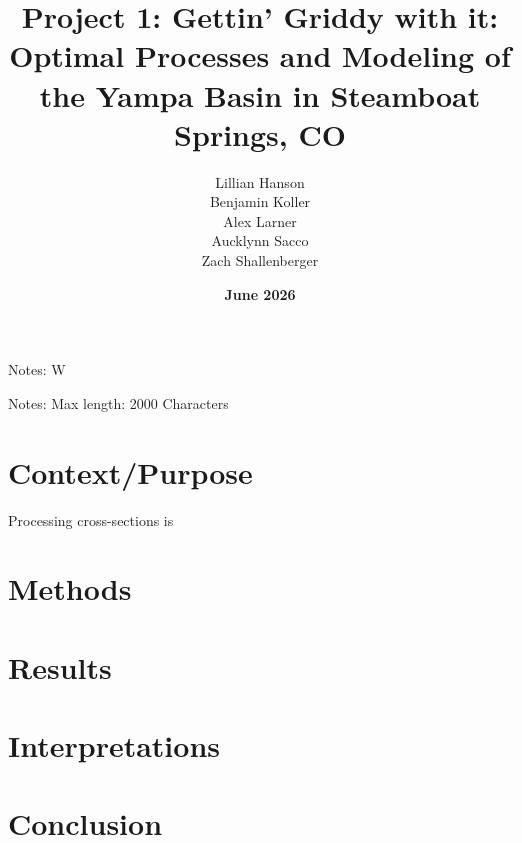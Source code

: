 \documentclass{article}
\title{Project 1: Gettin' Griddy with it: Optimal Processes and Modeling of the Yampa Basin in Steamboat Springs, CO}
\author{Lillian Hanson \\ Benjamin Koller \\ Alex Larner \\ Aucklynn Sacco \\ Zach Shallenberger}
\date{\textbf{June 2026}}
\begin{document}
Notes: W

\maketitle
Notes: Max length: 2000 Characters 
\section{Context/Purpose}
Processing cross-sections is 
\section{Methods}

\section{Results}

\section{Interpretations}

\section {Conclusion}
\end{document}
